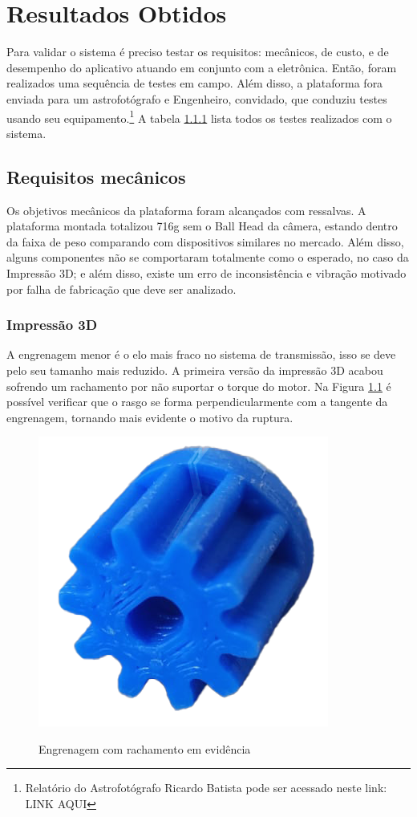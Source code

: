\chapter{Resultados Obtidos}

Para validar o sistema é preciso testar os requisitos: mecânicos, de custo, e de desempenho do aplicativo atuando em conjunto com a eletrônica. Então, foram realizados uma sequência de testes em campo. Além disso, a plataforma fora enviada para um astrofotógrafo e Engenheiro, convidado, que conduziu testes usando seu equipamento.\footnote{Relatório do Astrofotógrafo Ricardo Batista pode ser acessado neste link: LINK AQUI} A tabela \ref{} lista todos os testes realizados com o sistema.

\section{Requisitos mecânicos}

Os objetivos mecânicos da plataforma foram alcançados com ressalvas. A plataforma montada totalizou 716g sem o Ball Head da câmera, estando dentro da faixa de peso comparando com dispositivos similares no mercado. Além disso, alguns componentes não se comportaram totalmente como o esperado, no caso da Impressão 3D; e além disso, existe um erro de inconsistência e vibração motivado por falha de fabricação que deve ser analizado.


\subsection{Impressão 3D}
A engrenagem menor é o elo mais fraco no sistema de transmissão, isso se deve pelo seu tamanho mais reduzido. A primeira versão da impressão 3D acabou sofrendo um rachamento por não suportar o torque do motor. Na Figura \ref{fig:engrenagem} é possível verificar que o rasgo se forma perpendicularmente com a tangente da engrenagem, tornando mais evidente o motivo da ruptura.

\begin{figure}[htb]
	\centering
	\caption{Engrenagem com rachamento em evidência}
	\includegraphics[width=0.25\linewidth]{figuras/resultados/engrenagem}
	\label{fig:engrenagem}
\end{figure}

